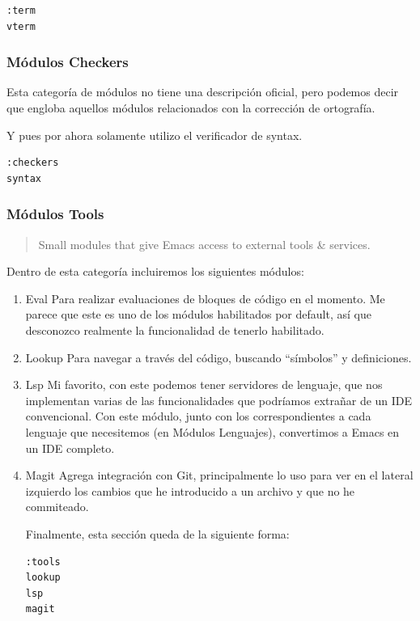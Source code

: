 \documentclass[11pt]{article}
\begin{document}
\begin{verbatim}
:term
vterm

\end{verbatim}
\subsubsection{Módulos Checkers}
\label{sec:org31b9b6e}

Esta categoría de módulos no tiene una descripción oficial, pero podemos decir que engloba aquellos módulos relacionados con la corrección de ortografía.

Y pues por ahora solamente utilizo el verificador de syntax.

\begin{verbatim}
:checkers
syntax

\end{verbatim}
\subsubsection{Módulos Tools}
\label{sec:org89ad68f}

\begin{quote}
Small modules that give Emacs access to external tools \& services.
\end{quote}

Dentro de esta categoría incluiremos los siguientes módulos:
\begin{enumerate}
\item Eval
\label{sec:org187cd97}
Para realizar evaluaciones de bloques de código en el momento. Me parece que este es uno de los módulos habilitados por default, así que desconozco realmente la funcionalidad de tenerlo habilitado.
\item Lookup
\label{sec:org5d426a5}
Para navegar a través del código, buscando ``símbolos'' y definiciones.
\item Lsp
\label{sec:org11c7d2a}
Mi favorito, con este podemos tener servidores de lenguaje, que nos implementan varias de las funcionalidades que podríamos extrañar de un IDE convencional. Con este módulo, junto con los correspondientes a cada lenguaje que necesitemos (en Módulos Lenguajes), convertimos a Emacs en un IDE completo.
\item Magit
\label{sec:org5ba05ba}
Agrega integración con Git, principalmente lo uso para ver en el lateral izquierdo los cambios que he introducido a un archivo y que no he commiteado.

Finalmente, esta sección queda de la siguiente forma:

\begin{verbatim}
:tools
lookup
lsp
magit

\end{verbatim}
\end{enumerate}
\end{document}
